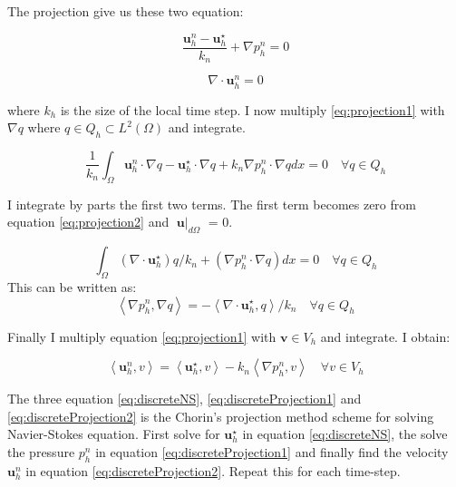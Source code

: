\documentclass[12pt,a4paper,english]{article}
\begin{document}
The projection give us these two equation:


\begin{equation}
\frac{\textbf{u}^{n}_{h} - \textbf{u}^{\star}_{h}}{k_n} + \nabla p^{n}_{h} = 0
\label{eq:projection1}
\end{equation}

\begin{equation}
\nabla \cdot \textbf{u}^{n}_{h} = 0
\label{eq:projection2}
\end{equation}

where $k_h$ is the size of the local time step. I now multiply \ref{eq:projection1} with $\nabla q$ where $q \in Q_h \subset L^2\left(\Omega \right)$ and integrate. 

$$
\frac{1}{k_n} \int_{\Omega} \textbf{u}^{n}_{h} \cdot \nabla q - \textbf{u}^{\star}_{h} \cdot \nabla q + k_n \nabla p^{n}_{h} \cdot \nabla q dx = 0 \quad \forall q \in Q_h
$$

I integrate by parts the first two terms. The first term becomes zero from equation \ref{eq:projection2} and $\textbf{u}\mid_{d\Omega}$ = 0.

$$
\int_{\Omega} \left( \nabla \cdot \textbf{u}^{\star}_{h} \right)q/k_n + \left( \nabla p^{n}_{h} \cdot \nabla q\right)  dx = 0 \quad \forall q \in Q_h
$$ 
This can be written as:
\begin{equation}
\left\langle \nabla p^{n}_{h} , \nabla q\right\rangle  = - \left\langle \nabla \cdot \textbf{u}^{\star}_{h} , q \right\rangle /k_n \quad \forall q \in Q_h
\label{eq:discreteProjection1}
\end{equation}

Finally I multiply equation \ref{eq:projection1} with $\textbf{v} \in V_h$ and integrate. I obtain:

\begin{equation}
\left\langle  \textbf{u}^{n}_{h} , v \right\rangle = \left\langle  \textbf{u}^{\star}_{h} , v \right\rangle - k_n\left\langle \nabla p^{n}_{h} , v\right\rangle \quad \forall v \in V_h
\label{eq:discreteProjection2}
\end{equation}

The three equation \ref{eq:discreteNS}, \ref{eq:discreteProjection1} and \ref{eq:discreteProjection2} is the Chorin's projection method scheme for solving Navier-Stokes equation. First solve for $\textbf{u}^{\star}_h$ in equation \ref{eq:discreteNS}, the solve the pressure $p^{n}_{h}$ in equation \ref{eq:discreteProjection1} and finally find the velocity $\textbf{u}^{n}_{h}$ in equation \ref{eq:discreteProjection2}. Repeat this for each time-step.
\end{document}
